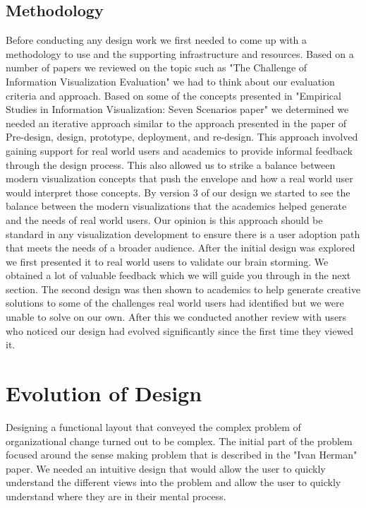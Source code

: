 \documentclass[journal]{vgtc}                %
\begin{document}
\subsection{Methodology}
Before conducting any design work we first needed to come up with a methodology to use and the supporting infrastructure and resources.  Based on a number of papers we reviewed on the topic such as "The Challenge of Information Visualization Evaluation" we had to think about our evaluation criteria and approach.  Based on some of the concepts presented in "Empirical Studies in Information Visualization: Seven Scenarios paper" we determined we needed an iterative approach similar to the approach presented in the paper of Pre-design, design, prototype, deployment, and re-design.  This approach involved gaining support for real world users and academics to provide informal feedback through the design process.  This also allowed us to strike a balance between modern visualization concepts that push the envelope and how a real world user would interpret those concepts.  By version 3 of our design we started to see the balance between the modern visualizations that the academics helped generate and the needs of real world users.  Our opinion is this approach should be standard in any visualization development to ensure there is a user adoption path that meets the needs of a broader audience.
After the initial design was explored we first presented it to real world users to validate our brain storming.  We obtained a lot of valuable feedback which we will guide you through in the next section.  The second design was then shown to academics to help generate creative solutions to some of the challenges real world users had identified but we were unable to solve on our own.  After this we conducted another review with users who noticed our design had evolved significantly since the first time they viewed it.

\section{Evolution of Design}

Designing a functional layout that conveyed the complex problem of organizational change turned out to be complex.  The initial part of the problem focused around the sense making problem that is described in the "Ivan Herman" paper.  We needed an intuitive design that would allow the user to quickly understand the different views into the problem and allow the user to quickly understand where they are in their mental process.
\end{document}
